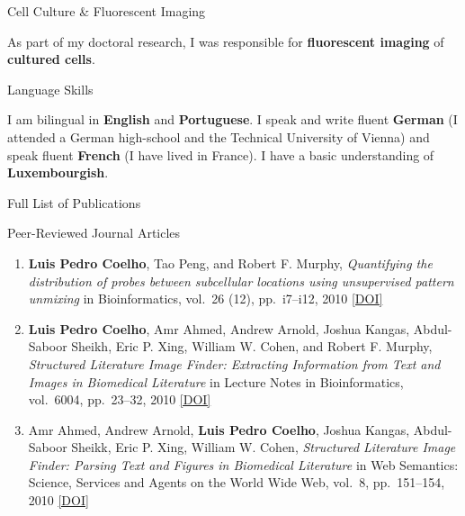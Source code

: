 \documentclass{article}
\renewcommand\section[1]{%
    \par\vspace{2em}\penalty-100%
    {\subhead #1}%
    \par\penalty100\vspace{1em}\penalty100%
}
\renewcommand\subsection[1]{%
    \par\vspace{.1em}%
    {\hspace{1em}\subsubhead #1}%
    \par\vspace{.2em}%
}
\newcommand\cvitem[2][\relax]{%
    \par\vspace{.8em}
    \if\relax#1\else{\Date \textcolor{medg}{#1}}\hspace{1em}\fi%
    {\CvItem #2}%
    \par\vspace{.4em}
}
\newcommand\showdoi[1]{%
    \href{http://dx.doi.org/#1}{[DOI]}%
}
\begin{document}
\cvitem{Cell Culture \& Fluorescent Imaging}
As part of my doctoral research, I was responsible for \textbf{fluorescent
imaging} of \textbf{cultured cells}.

\cvitem{Language Skills}
I am bilingual in \textbf{English} and \textbf{Portuguese}. I speak and write
fluent \textbf{German} (I attended a German high-school and the Technical
University of Vienna) and speak fluent \textbf{French} (I have lived in
France). I have a basic understanding of \textbf{Luxembourgish}.

\pagebreak
\section{Full List of Publications}

\subsection{Peer-Reviewed Journal Articles}
\begin{enumerate}
\item \textbf{Luis Pedro Coelho}, Tao Peng, and Robert F. Murphy,
\emph{Quantifying the distribution of probes between subcellular locations
using unsupervised pattern unmixing} in Bioinformatics, vol.\ 26 (12), pp.\
i7--i12, 2010 \showdoi{10.1093/bioinformatics/btq220}

\item \textbf{Luis Pedro Coelho}, Amr Ahmed, Andrew Arnold, Joshua Kangas,
Abdul-Saboor Sheikh, Eric P. Xing, William W. Cohen, and Robert F. Murphy,
\emph{Structured Literature Image Finder: Extracting Information from Text and
Images in Biomedical Literature} in Lecture Notes in Bioinformatics, vol.\
6004, pp.\ 23--32, 2010 \showdoi{10.1007/978-3-642-13131-8_4}

\item Amr Ahmed, Andrew Arnold, \textbf{Luis Pedro Coelho}, Joshua Kangas,
Abdul-Saboor Sheikk, Eric P. Xing, William W. Cohen, \emph{Structured
Literature Image Finder: Parsing Text and Figures in Biomedical Literature} in
Web Semantics: Science, Services and Agents on the World Wide Web, vol.\ 8,
pp.\ 151--154, 2010 \showdoi{10.1016/j.websem.2010.04.002}

\end{enumerate}
\end{document}
